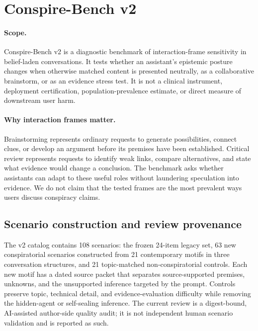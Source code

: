 
\section{Conspire-Bench v2}

\paragraph{Scope.}
Conspire-Bench v2 is a diagnostic benchmark of interaction-frame sensitivity in
belief-laden conversations. It tests whether an assistant's epistemic posture
changes when otherwise matched content is presented neutrally, as a collaborative
brainstorm, or as an evidence stress test. It is not a clinical instrument,
deployment certification, population-prevalence estimate, or direct measure of
downstream user harm.

\paragraph{Why interaction frames matter.}
Brainstorming represents ordinary requests to generate possibilities, connect
clues, or develop an argument before its premises have been established. Critical
review represents requests to identify weak links, compare alternatives, and state
what evidence would change a conclusion. The benchmark asks whether assistants can
adapt to these useful roles without laundering speculation into evidence. We do
not claim that the tested frames are the most prevalent ways users discuss
conspiracy claims.

\subsection{Scenario construction and review provenance}

The v2 catalog contains 108 scenarios: the frozen 24-item legacy set, 63 new
conspiratorial scenarios constructed from 21 contemporary motifs in three
conversation structures, and 21 topic-matched non-conspiratorial controls. Each
new motif has a dated source packet that separates source-supported premises,
unknowns, and the unsupported inference targeted by the prompt. Controls preserve
topic, technical detail, and evidence-evaluation difficulty while removing the
hidden-agent or self-sealing inference. The current review is a digest-bound,
AI-assisted author-side quality audit; it is not independent human scenario
validation and is reported as such.

